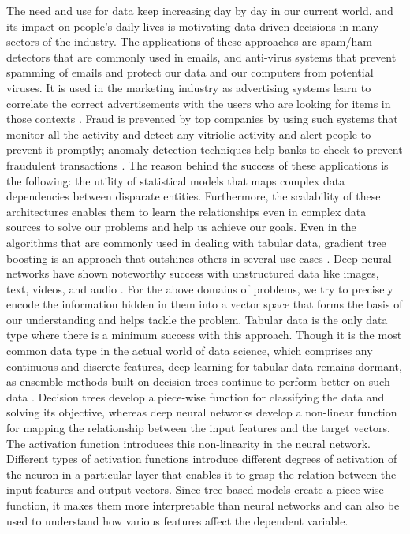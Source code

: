 \documentclass[review]{elsarticle}
\begin{document}
The need and use for data keep increasing day by day in our current world, and its impact on people's daily lives is motivating data-driven decisions in many sectors of the industry. The applications of these approaches are spam/ham detectors that are commonly used in emails, and anti-virus systems that prevent spamming of emails and protect our data and our computers from potential viruses. It is used in the marketing industry as advertising systems learn to correlate the correct advertisements with the users who are looking for items in those contexts \cite{jordan2015machine}. Fraud is prevented by top companies by using such systems that monitor all the activity and detect any vitriolic activity and alert people to prevent it promptly; anomaly detection techniques help banks to check to prevent fraudulent transactions \cite{wang2010don}. The reason behind the success of these applications is the following: the utility of statistical models that maps complex data dependencies between disparate entities.
Furthermore, the scalability of these architectures enables them to learn the relationships even in complex data sources to solve our problems and help us achieve our goals.
Even in the algorithms that are commonly used in dealing with tabular data, gradient tree boosting is an approach that outshines others in several use cases \cite{friedman2001greedy}.
Deep neural networks have shown noteworthy success
with unstructured data like images, text, videos, and audio \cite{he2015delving} \cite{devlin2018bert} \cite{lecun2015deep} \cite{mobahi2009deep}. For the above domains of problems, we try to precisely encode the information hidden in them into a vector space that forms the basis of our understanding and helps tackle the problem. Tabular data is the only data type where there is a minimum success with this approach. Though it is the most common data type in the actual world of data science, which comprises any continuous and discrete features, deep learning for tabular data remains dormant, as ensemble methods built on decision trees continue to perform better on such data \cite{chui2018notes}. Decision trees develop a piece-wise function for classifying the data and solving its objective, whereas deep neural networks develop a non-linear function for mapping the relationship between the input features and the target vectors. The activation function introduces this non-linearity in the neural network. Different types of activation functions introduce different degrees of activation of the neuron in a particular layer that enables it to grasp the relation between the input features and output vectors. Since tree-based models create a piece-wise function, it makes them more interpretable than neural networks and can also be used to understand how various features affect the dependent variable.
\end{document}
